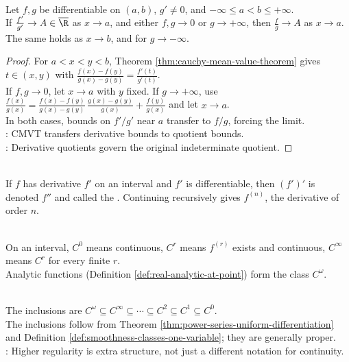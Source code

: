 \begin{theorem} \label{thm:lhospital-one-sided} \\
Let $f,g$ be differentiable on $(a,b)$, $g'\neq0$, and $-\infty\leq a<b\leq+\infty$.\\
If $\frac{f'}{g'}\to A\in\overline{\R}$ as $x\to a$, and either $f,g\to0$ or $g\to+\infty$, then $\frac{f}{g}\to A$ as $x\to a$.\\
The same holds as $x\to b$, and for $g\to-\infty$.
\begin{proof}
For $a<x<y<b$, Theorem \ref{thm:cauchy-mean-value-theorem} gives $t\in(x,y)$ with $\frac{f(x)-f(y)}{g(x)-g(y)}=\frac{f'(t)}{g'(t)}$.\\
If $f,g\to0$, let $x\to a$ with $y$ fixed. If $g\to+\infty$, use $\frac{f(x)}{g(x)} =\frac{f(x)-f(y)}{g(x)-g(y)}\,\frac{g(x)-g(y)}{g(x)}+\frac{f(y)}{g(x)}$ and let $x\to a$.\\
In both cases, bounds on $f'/g'$ near $a$ transfer to $f/g$, forcing the limit.\\
: CMVT transfers derivative bounds to quotient bounds.\\
: Derivative quotients govern the original indeterminate quotient.
\end{proof}
\end{theorem}

\begin{definition} \label{def:higher-derivatives} \\
If $f$ has derivative $f'$ on an interval and $f'$ is differentiable, then $(f')'$ is denoted $f''$ and called the . Continuing recursively gives $f^{(n)}$, the derivative of order $n$.
\end{definition}

\begin{definition} \label{def:smoothness-classes-one-variable} \\
On an interval, $C^0$ means continuous, $C^r$ means $f^{(r)}$ exists and continuous, $C^\infty$ means $C^r$ for every finite $r$.\\
Analytic functions (Definition \ref{def:real-analytic-at-point}) form the class $C^\omega$.
\end{definition}

\begin{perspective} \label{per:regularity-hierarchy-one-variable} \\
The inclusions are $C^\omega\subseteq C^\infty\subseteq \cdots \subseteq C^2\subseteq C^1\subseteq C^0$.\\
The inclusions follow from Theorem \ref{thm:power-series-uniform-differentiation} and Definition \ref{def:smoothness-classes-one-variable}; they are generally proper.\\
: Higher regularity is extra structure, not just a different notation for continuity.
\end{perspective}

